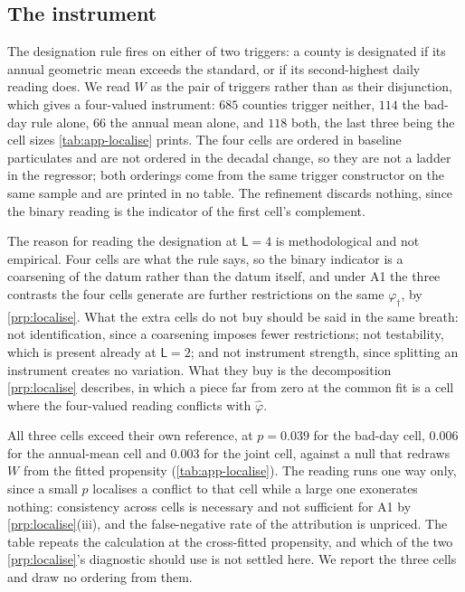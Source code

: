 \documentclass[
  12pt]{article}
\newcommand{\1}[1]{\mathds{1}\left[#1\right]}
\theoremstyle{plain}
\theoremstyle{definition}
\theoremstyle{definition}
\theoremstyle{remark}
\newcommand{\vdagger}{\varphi_{\dagger}}
\begin{document}
\subsection{The instrument}\label{the-instrument}

The designation rule fires on either of two triggers: a county is
designated if its annual geometric mean exceeds the standard, or if its
second-highest daily reading does. We read \(W\) as the pair of triggers
rather than as their disjunction, which gives a four-valued instrument:
\(685\) counties trigger neither, \(114\) the bad-day rule alone, \(66\)
the annual mean alone, and \(118\) both, the last three being the cell
sizes \cref{tab:app-localise} prints. The four cells are ordered in
baseline particulates and are not ordered in the decadal change, so they
are not a ladder in the regressor; both orderings come from the same
trigger constructor on the same sample and are printed in no table. The
refinement discards nothing, since the binary reading is the indicator
of the first cell's complement.

The reason for reading the designation at \(\mathsf L=4\) is
methodological and not empirical. Four cells are what the rule says, so
the binary indicator is a coarsening of the datum rather than the datum
itself, and under A1 the three contrasts the four cells generate are
further restrictions on the same \(\vdagger\), by \cref{prp:localise}.
What the extra cells do not buy should be said in the same breath: not
identification, since a coarsening imposes fewer restrictions; not
testability, which is present already at \(\mathsf L=2\); and not
instrument strength, since splitting an instrument creates no variation.
What they buy is the decomposition \cref{prp:localise} describes, in
which a piece far from zero at the common fit is a cell where the
four-valued reading conflicts with \(\hat\varphi\).

All three cells exceed their own reference, at \(p=0.039\) for the
bad-day cell, \(0.006\) for the annual-mean cell and \(0.003\) for the
joint cell, against a null that redraws \(W\) from the fitted propensity
(\cref{tab:app-localise}). The reading runs one way only, since a small
\(p\) localises a conflict to that cell while a large one exonerates
nothing: consistency across cells is necessary and not sufficient for A1
by \cref{prp:localise}(iii), and the false-negative rate of the
attribution is unpriced. The table repeats the calculation at the
cross-fitted propensity, and which of the two \cref{prp:localise}'s
diagnostic should use is not settled here. We report the three cells and
draw no ordering from them.
\end{document}

